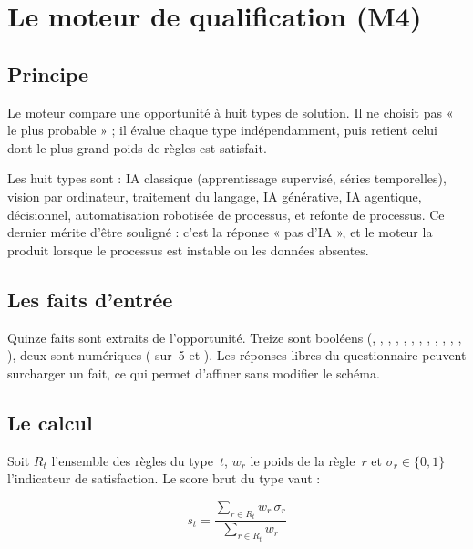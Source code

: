 \section{Le moteur de qualification (M4)}

\subsection{Principe}

Le moteur compare une opportunité à huit types de solution. Il ne choisit pas « le plus
probable » ; il évalue chaque type indépendamment, puis retient celui dont le plus grand
poids de règles est satisfait.

Les huit types sont : IA classique (apprentissage supervisé, séries temporelles), vision
par ordinateur, traitement du langage, IA générative, IA agentique, décisionnel,
automatisation robotisée de processus, et refonte de processus. Ce dernier mérite d'être
souligné : c'est la réponse « pas d'IA », et le moteur la produit lorsque le processus
est instable ou les données absentes.

\subsection{Les faits d'entrée}

Quinze faits sont extraits de l'opportunité. Treize sont booléens
(, , ,
, , ,
, , ,
, , ,
), deux sont numériques ( sur~5 et
). Les réponses libres du questionnaire peuvent surcharger un
fait, ce qui permet d'affiner sans modifier le schéma.

\subsection{Le calcul}

Soit $R_t$ l'ensemble des règles du type~$t$, $w_r$ le poids de la règle~$r$ et
$\sigma_r \in \{0,1\}$ l'indicateur de satisfaction. Le score brut du type vaut :

\begin{equation}
s_t = \frac{\displaystyle\sum_{r \in R_t} w_r \, \sigma_r}{\displaystyle\sum_{r \in R_t} w_r}
\label{eq:score-type}
\end{equation}

